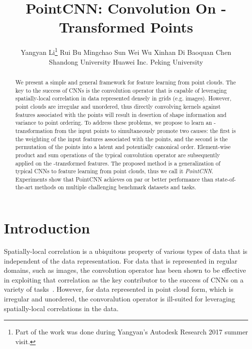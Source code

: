 \documentclass{article}
\title{PointCNN: Convolution On -Transformed Points}
\author{
  Yangyan Li\textsuperscript{\textdagger}\thanks{Part of the work was done during Yangyan's Autodesk Research 2017 summer visit.} \quad Rui Bu\textsuperscript{\textdagger} \quad Mingchao Sun\textsuperscript{\textdagger} \quad Wei Wu\textsuperscript{\textdagger} \quad Xinhan Di\textsuperscript{\textdaggerdbl} \quad Baoquan Chen\textsuperscript{\textsection}\\
  \And
  \textsuperscript{\textdagger}Shandong University \hspace{0.6in} \textsuperscript{\textdaggerdbl}Huawei Inc. \hspace{0.6in}
  \textsuperscript{\textsection}Peking University \\
}
\begin{document}
\maketitle

\begin{abstract}
	We present a simple and general framework for feature learning from point clouds. The key to the success of CNNs is the convolution operator that is capable of leveraging spatially-local correlation in data represented densely in grids (e.g. images). However, point clouds are irregular and unordered, thus directly convolving kernels against features associated with the points will result in desertion of shape information and variance to point ordering. To address these problems, we propose to learn an -transformation from the input points to simultaneously promote two causes: the first is the weighting of the input features associated with the points, and the second is the permutation of the points into a latent and potentially canonical order. Element-wise product and sum operations of the typical convolution operator are subsequently applied on the -transformed features. The proposed method is a generalization of typical CNNs to feature learning from point clouds, thus we call it \emph{PointCNN}. Experiments show that PointCNN achieves on par or better performance than state-of-the-art methods on multiple challenging benchmark datasets and tasks.
\end{abstract}


 \section{Introduction}
\label{sec:introduction}

Spatially-local correlation is a ubiquitous property of various types of data that is independent of the data representation. For data that is represented in regular domains, such as images, the convolution operator has been shown to be effective in exploiting that correlation as the key contributor to the success of CNNs on a variety of tasks~\cite{lecun2015deep}. However, for data represented in point cloud form, which is irregular and unordered, the convoralution operator is ill-suited for leveraging spatially-local correlations in the data.
\end{document}
